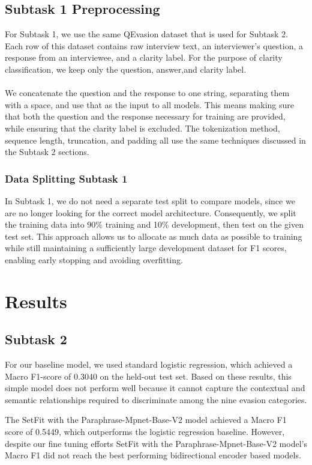 \documentclass[11pt]{article}
\begin{document}
\subsection{Subtask 1 Preprocessing}
For Subtask 1, we use the same QEvasion dataset that is used for Subtask 2. Each row of this dataset contains raw interview text, an interviewer's question, a response from an interviewee, and a clarity label. For the purpose of clarity classification, we keep only the question, answer,and clarity label.

\paragraph{}
We concatenate the question and the response to one string, separating them with a space, and use that as the input to all models. This means making sure that both the question and the response necessary for training are provided, while ensuring that the clarity label is excluded. The tokenization method, sequence length, truncation, and padding all use the same techniques discussed in the Subtask 2 sections.


\subsubsection{Data Splitting Subtask 1}
In Subtask 1, we do not need a separate test split to compare models, since we are no longer looking for the correct model architecture. Consequently, we split the training data into 90\% training and 10\% development, then test on the given test set. This approach allows us to allocate as much data as possible to training while still maintaining a sufficiently large development dataset for F1 scores, enabling early stopping and avoiding overfitting.

\section{Results}
\subsection{Subtask 2}
For our baseline model, we used standard logistic regression, which achieved a Macro F1-score of 0.3040 on the held-out test set. Based on these results, this simple model does not perform well because it cannot capture the contextual and semantic relationships required to discriminate among the nine evasion categories.

The SetFit with the Paraphrase-Mpnet-Base-V2 model achieved a Macro F1 score of 0.5449, which outperforms the logistic regression baseline. However, despite our fine tuning efforts SetFit with the Paraphrase-Mpnet-Base-V2 model’s Macro F1 did not reach the best performing bidirectional encoder based models.
\end{document}
